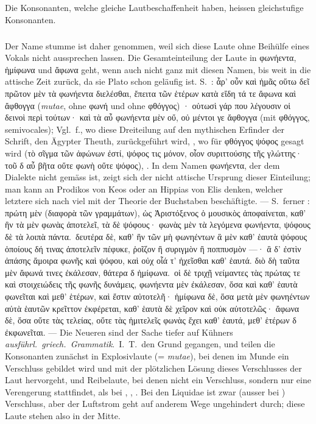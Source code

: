 Die Konsonanten, welche gleiche Lautbeschaffenheit haben, heissen gleichstufige Konsonanten.

{\small\noindent\subparagraph{} Der Name stumme ist daher genommen,
weil sich diese Laute ohne Beihülfe eines Vokals nicht aussprechen lassen. Die
Gesamteinteilung der Laute in φωνήεντα, ἡμίφωνα und ἄφωνα geht, wenn auch
nicht ganz mit diesen Namen, bis weit in die attische Zeit zurück, da sie
Plato schon geläufig ist. S.\ : ἆρ’ οὖν καὶ ἡμᾶς οὕτω δεῖ πρῶτον
μὲν τὰ φωνήεντα διελέσθαι, ἔπειτα τῶν ἑτέρων κατὰ εἴδη τά τε ἄφωνα καὶ ἄφθογγα
(\emph{mutae}, ohne φωνή und ohne φθόγγος) · οὑτωσὶ γάρ που λέγουσιν οἱ δεινοὶ περὶ
τούτων· καὶ τὰ αὖ φωνήεντα μὲν οὔ, οὐ μέντοι γε ἄφθογγα (mit φθόγγος,
semivocales); Vgl.\ f., wo diese Dreiteilung auf den mythischen
Erfinder der Schrift, den Ägypter Theuth, zurückgeführt wird, ,
wo für φθόγγος ψόφος gesagt wird (τὸ σῖγμα τῶν ἀφώνων ἐστί, ψόφος τις μόνον,
οἶον συριττούσης τῆς γλώττης· τοῦ δ αὖ βῆτα οὔτε φωνὴ οὔτε ψόφος),
. In dem Namen φωνήεντα, der dem
 Dialekte nicht gemäss ist, zeigt
sich der nicht attische Ursprung dieser Einteilung; man kann an Prodikos von
Keos oder an Hippias von Elis denken, welcher letztere sich nach
 viel mit der Theorie der Buchstaben beschäftigte. — S.\ ferner
: πρώτη μὲν (διαφορὰ τῶν γραμμάτων),
ὡς Ἀριστόξενος ὁ μουσικὸς ἀποφαίνεται, καθ’ ἣν τὰ μὲν φωνὰς ἀποτελεῖ, τὰ δὲ
ψόφους· φωνὰς μὲν τὰ λεγόμενα φωνήεντα, ψόφους δὲ τὰ λοιπὰ πάντα.\ δευτέρα δὲ,
καθ’ ἣν τῶν μὴ φωνηέντων ἃ μὲν καθ’ ἑαυτὰ ψόφους ὁποίους δή τινας ἀποτελεῖν
πέφυκε, ῥοῖζον ἢ συριγμὸν ἢ ποππυσμὸν —· ἃ δ’ ἐστὶν ἁπάσης ἄμοιρα φωνῆς καὶ
ψόφου, καὶ οὐχ οἷά τ’ ἠχεῖσθαι καθ’ ἑαυτά. διὸ δὴ ταῦτα μὲν ἄφωνά τινες
ἐκάλεσαν, θάτερα δ ἡμίφωνα.\ οἱ δὲ τριχῇ νείμαντες τὰς πρώτας τε καὶ
στοιχειώδεις τῆς φωνῆς δυνάμεις, φωνήεντα μὲν ἐκάλεσαν, ὅσα καὶ καθ’ ἑαυτὰ
φωνεῖται καὶ μεθ’ ἑτέρων, καὶ ἔστιν αὐτοτελῆ· ἡμίφωνα δὲ, ὅσα μετὰ μὲν
φωνηέντων αὐτὰ ἑαυτῶν κρεῖττον ἐκφέρεται, καθ’ ἑαυτὰ δὲ χεῖρον καὶ οὐκ
αὐτοτελῶς· ἄφωνα δὲ, ὅσα οὔτε τὰς τελείας, οὔτε τὰς ἡμιτελεῖς φωνὰς ἔχει καθ’
ἑαυτά, μεθ’ ἑτέρων δ ἐκφωνεῖται. — Die Neueren sind der Sache tiefer auf
Kühners \emph{ausführl.\ griech.\ Grammatik}.\ I.\ T.\ den Grund gegangen, und
teilen die Konsonanten zunächst in Explosivlaute (= \emph{mutae}), bei denen im Munde
ein Verschluss gebildet wird und mit der plötzlichen Lösung dieses
Verschlusses der Laut hervorgeht, und Reibelaute, bei denen nicht ein
Verschluss, sondern nur eine Verengerung stattfindet, als bei ,
, . Bei
den Liquidae ist zwar (ausser bei ) Verschluss, aber der Luftstrom geht auf
anderem Wege ungehindert durch; diese Laute stehen also in der Mitte.}

